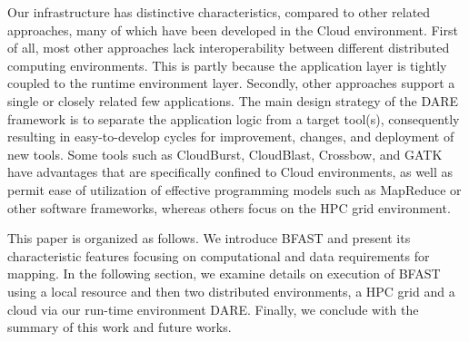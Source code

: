 \documentclass{sig-alternate}
\begin{document}
Our infrastructure has distinctive characteristics, compared to other
related approaches\cite{taylor2010,cloudburst, cloudblast,
  langmead2009,langmead2010,gatk,halligan2009,luyf-2010}, many of
which have been developed in the Cloud environment.  First of all,
most other approaches lack interoperability between different
distributed computing environments.  This is partly because the
application layer is tightly coupled to the runtime environment layer.
Secondly, other approaches support a single or closely related few
applications.  The main design strategy of the DARE framework is to
separate the application logic from a target tool(s), consequently
resulting in easy-to-develop cycles for improvement, changes, and
deployment of new tools.  %
Some tools such as CloudBurst\cite{cloudburst},
CloudBlast\cite{cloudblast}, Crossbow\cite{langmead2009}, and
GATK\cite{gatk} have advantages that are specifically confined to
Cloud environments, as well as permit ease of utilization of effective
programming models such as MapReduce or other software frameworks,
whereas others\cite{luyf-2010} focus on the HPC grid environment.

This paper is organized as follows.  We introduce BFAST and present
its characteristic features focusing on computational and data
requirements for mapping.  In the following section, we examine
details on execution of BFAST using a local resource and then two
distributed environments, a HPC grid and a cloud via our run-time
environment DARE.  Finally, we conclude with the summary of this work
and future works.




\end{document}
